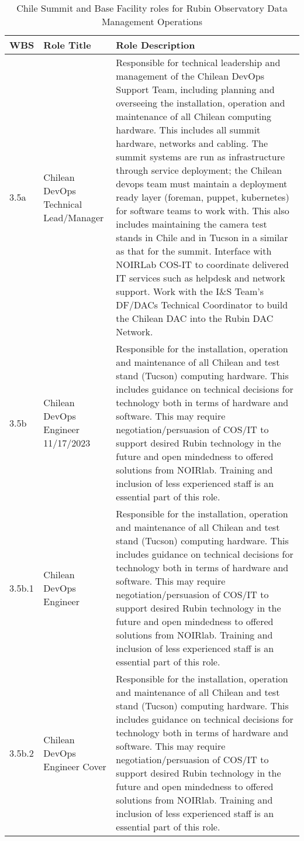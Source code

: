 \normalsize \begin{longtable} {|p{}|p{}|p{}|} \caption{Chile Summit and Base Facility roles for Rubin Observatory Data Management Operations \label{tab:chdfroles}}\\ 
\hline 
\textbf{WBS}&\textbf{Role Title}&\textbf{Role Description} \\ \hline
{3.5a}&{Chilean DevOps Technical Lead/Manager}&{Responsible for technical leadership and management of the Chilean DevOps Support Team, including planning and overseeing the installation, operation and maintenance of all Chilean computing hardware. This includes all summit hardware, networks and cabling. The summit systems are run as infrastructure through service deployment; the Chilean devops team must maintain a deployment ready layer (foreman, puppet, kubernetes) for software teams to work with. This also includes maintaining the camera test stands in Chile and in Tucson in a similar as that for the summit. Interface with NOIRLab COS-IT to coordinate delivered IT services such as helpdesk and network support. Work with the I\&S Team's DF/DACs Technical Coordinator to build the Chilean DAC into the Rubin DAC Network.} \\ \hline
{3.5b}&{Chilean DevOps Engineer 11/17/2023}&{Responsible for the installation, operation and maintenance of all Chilean and test stand (Tucson) computing hardware. This includes guidance on technical decisions for technology both in terms of hardware and software. This may require negotiation/persuasion of COS/IT to support desired Rubin technology in the future and open mindedness to offered solutions from NOIRlab. Training and inclusion of less experienced staff is an essential part of this role.} \\ \hline
{3.5b.1}&{Chilean DevOps Engineer}&{Responsible for the installation, operation and maintenance of all Chilean and test stand (Tucson) computing hardware. This includes guidance on technical decisions for technology both in terms of hardware and software. This may require negotiation/persuasion of COS/IT to support desired Rubin technology in the future and open mindedness to offered solutions from NOIRlab. Training and inclusion of less experienced staff is an essential part of this role.} \\ \hline
{3.5b.2}&{Chilean DevOps Engineer Cover}&{Responsible for the installation, operation and maintenance of all Chilean and test stand (Tucson) computing hardware. This includes guidance on technical decisions for technology both in terms of hardware and software. This may require negotiation/persuasion of COS/IT to support desired Rubin technology in the future and open mindedness to offered solutions from NOIRlab. Training and inclusion of less experienced staff is an essential part of this role.} \\ \hline
\end{longtable} \normalsize
